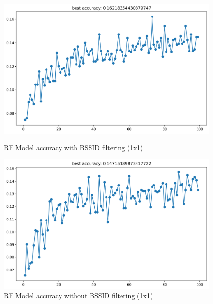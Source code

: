\documentclass[conference]{IEEEtran}
\begin{document}
	\begin{figure}[hbt!]
		\centering
		\begin{minipage}{0.45\textwidth}
			\centering
			\includegraphics[width=\linewidth]{image5.png}
			\caption{RF Model accuracy with BSSID filtering (1x1)}
			\label{fig:rf_acc_filter}
		\end{minipage}
		\hfill
		\begin{minipage}{0.45\textwidth}
			\centering
			\includegraphics[width=\linewidth]{image6.png}
			\caption{RF Model accuracy without BSSID filtering (1x1)}
			\label{fig:rf_acc_nofilter}
		\end{minipage}
		
		\vspace{0.5cm} %
		

\end{figure}
\end{document}

